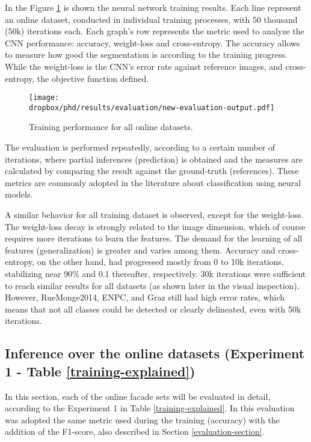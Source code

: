 In the Figure \ref{training-result} is shown the neural network training results. Each line represent an online dataset, conducted in individual training processes, with 50 thousand (50k) iterations each. Each graph's row represents the metric used to analyze the CNN performance: accuracy, weight-loss and cross-entropy. The accuracy allows to measure how good the segmentation is according to the training progress. While the weight-loss is the CNN's error rate against reference images, and cross-entropy, the objective function defined.
\begin{figure}[!htp]
    \centering    
    \caption{Training performance for all online datasets.}
    \vspace{6mm}
    \texttt{[image: \\dropbox/phd/results/evaluation/new-evaluation-output.pdf]}       
	\legenda{}
    \label{training-result}
\end{figure}

The evaluation is performed repeatedly, according to a certain number of iterations, where partial inferences (prediction) is obtained and the measures are calculated by comparing the result against the ground-truth (references). These metrics are commonly adopted in the literature about classification using neural models.  

A similar behavior for all training dataset is observed, except for the weight-loss. The weight-loss decay is strongly related to the image dimension, which of course requires more iterations to learn the features. The demand for the learning of all features (generalization) is greater and varies among them. Accuracy and cross-entropy, on the other hand, had progressed mostly from 0 to 10k iterations, stabilizing near 90\% and 0.1 thereafter, respectively. 30k iterations were sufficient to reach similar results for all datasets (as shown later in the visual inspection). However, RueMonge2014, ENPC, and Graz still had high error rates, which means that not all classes could be detected or clearly delineated, even with 50k iterations.

\subsection{Inference over the online datasets (Experiment 1 - Table \ref{training-explained})}
In this section, each of the online facade sets will be evaluated in detail, according to the Experiment 1 in Table \ref{training-explained}. In this evaluation was adopted the same metric used during the training (accuracy) with the addition of the F1-score, also described in Section \ref{evaluation-section}.

